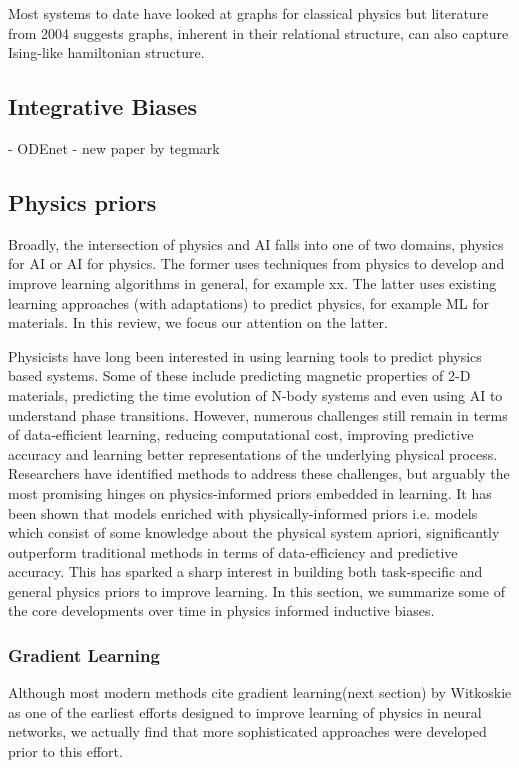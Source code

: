 \documentclass{article}
\begin{document}
Most systems to date have looked at graphs for classical physics but literature from 2004 suggests graphs, inherent in their relational structure, can also capture Ising-like hamiltonian structure.


\subsection{Integrative Biases}
- ODEnet
- new paper by tegmark

\subsection{Physics priors}


Broadly, the intersection of physics and AI falls into one of two domains, physics for AI or AI for physics. The former uses techniques from physics to develop and improve learning algorithms in general, for example xx. The latter uses existing learning approaches (with adaptations) to predict physics, for example ML for materials. In this review, we focus our attention on the latter.

Physicists have long been interested in using learning tools to predict physics based systems. Some of these include predicting magnetic properties of 2-D materials, predicting the time evolution of N-body systems and even using AI to understand phase transitions. However, numerous challenges still remain in terms of data-efficient learning, reducing computational cost, improving predictive accuracy and learning better representations of the underlying physical process. Researchers have identified methods to address these challenges, but arguably the most promising hinges on physics-informed priors embedded in learning. It has been shown that models enriched with physically-informed priors i.e. models which consist of some knowledge about the physical system apriori, significantly outperform traditional methods in terms of data-efficiency and predictive accuracy. This has sparked a sharp interest in building both task-specific and general physics priors to improve learning. In this section, we summarize some of the core developments over time in physics informed inductive biases. 

\subsubsection*{Gradient Learning}

Although most modern methods cite gradient learning(next section) by Witkoskie as one of the earliest efforts designed to improve learning of physics in neural networks, we actually find that more sophisticated approaches were developed prior to this effort.
\end{document}
